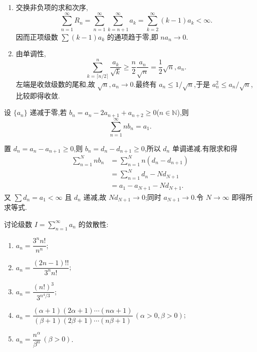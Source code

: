 \begin{solution}
    \leavevmode
    \begin{enumerate}
        \item 交换非负项的求和次序,
              \[
                  \displaystyle\sum\limits_{n=1}^{\infty}R_n
                  =\sum\limits_{n=1}^{\infty}\sum\limits_{k=n+1}^{\infty}a_k
                  =\sum\limits_{k=2}^{\infty}(k-1)a_k<\infty.
              \]
              因而正项级数 $\displaystyle \sum(k-1)a_k$ 的通项趋于零,即 $na_n\to0$.
        \item 由单调性,
              \[
                  \displaystyle\sum\limits_{k=\lceil n/2\rceil}^{n}\dfrac{a_k}{\sqrt k}
                  \geq\dfrac{n}{2}\dfrac{a_n}{\sqrt n}=\dfrac{1}{2}\sqrt n,a_n.
              \]
              左端是收敛级数的尾和,故 $\sqrt n,a_n\to0$.最终有
              $a_n\leq1/\sqrt n$,于是 $a_n^2\leq a_n/\sqrt n$,比较即得收敛.
    \end{enumerate}
\end{solution}

\begin{example}
    设 $\{a_n\}$ 递减于零,若 $b_n=a_n-2a_{n+1}+a_{n+2}\geq0$($n\in\mathbb{N}$),则
    \[
        \displaystyle\sum\limits_{n=1}^{\infty}nb_n=a_1.
    \]
\end{example}
\exampleblank

\begin{solution}
    置 $d_n=a_n-a_{n+1}\geq0$,则 $b_n=d_n-d_{n+1}\geq0$,所以
    $d_n$ 单调递减.有限求和得
    \[
        \begin{aligned}
            \sum\limits_{n=1}^{N}nb_n
             & =\sum\limits_{n=1}^{N}n(d_n-d_{n+1}) \\
             & =\sum\limits_{n=1}^{N}d_n-Nd_{N+1}   \\
             & =a_1-a_{N+1}-Nd_{N+1}.
        \end{aligned}
    \]
    又 $\displaystyle \sum d_n=a_1<\infty$ 且 $d_n$ 递减,故 $Nd_{N+1}\to0$;同时
    $a_{N+1}\to0$.令 $N\to\infty$ 即得所求等式.
\end{solution}




\begin{example}
    讨论级数 $\displaystyle I=\sum\limits_{n=1}^{\infty}a_n$ 的敛散性:
    \begin{enumerate}
        \item $\displaystyle a_n=\dfrac{3^n n!}{n^n}$;
        \item $\displaystyle a_n=\dfrac{(2n-1)!!}{3^n n!}$;
        \item $\displaystyle a_n=\dfrac{(n!)^3}{3^{n^4/3}}$;
        \item $\displaystyle a_n=\dfrac{(\alpha+1)(2\alpha+1)\cdots(n\alpha+1)}{(\beta+1)(2\beta+1)\cdots(n\beta+1)}\,(\alpha>0,\beta>0)$;
        \item $\displaystyle a_n=\dfrac{n^\alpha}{\beta^n}\,(\beta>0)$.
    \end{enumerate}
\end{example}
\exampleblank

